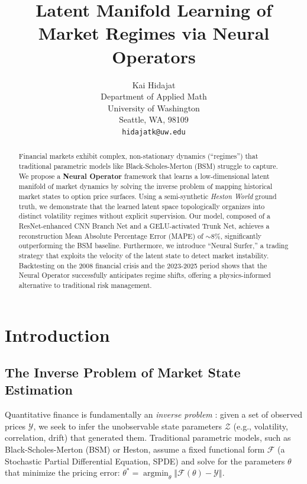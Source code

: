 \documentclass{article}
\title{Latent Manifold Learning of Market Regimes via Neural Operators}
\author{%
  Kai Hidajat \\
  Department of Applied Math \\
  University of Washington \\
  Seattle, WA, 98109\\
  \texttt{hidajatk@uw.edu} \\
}
\newcommand\norm[1]{\left\Vert #1 \right\Vert}
\newcommand{\argmin}{\operatorname{argmin}}
\begin{document}
\maketitle

\begin{abstract}
    Financial markets exhibit complex, non-stationary dynamics (``regimes'') that traditional parametric models like Black-Scholes-Merton (BSM) struggle to capture. We propose a \textbf{Neural Operator} framework that learns a low-dimensional latent manifold of market dynamics by solving the inverse problem of mapping historical market states to option price surfaces. Using a semi-synthetic \emph{Heston World} ground truth, we demonstrate that the learned latent space topologically organizes into distinct volatility regimes without explicit supervision. Our model, composed of a ResNet-enhanced CNN Branch Net and a GELU-activated Trunk Net, achieves a reconstruction Mean Absolute Percentage Error (MAPE) of \(\sim\!8\%\), significantly outperforming the BSM baseline. Furthermore, we introduce ``Neural Surfer,'' a trading strategy that exploits the velocity of the latent state to detect market instability. Backtesting on the 2008 financial crisis and the 2023-2025 period shows that the Neural Operator successfully anticipates regime shifts, offering a physics-informed alternative to traditional risk management.
\end{abstract}

\section{Introduction}

\subsection{The Inverse Problem of Market State Estimation}
Quantitative finance is fundamentally an \emph{inverse problem} \citep{bouchouev1997}: given a set of observed prices \(\mathcal{Y}\), we seek to infer the unobservable state parameters \(\mathcal{Z}\) (e.g., volatility, correlation, drift) that generated them. Traditional parametric models, such as Black-Scholes-Merton (BSM) or Heston, assume a fixed functional form \(\mathcal{F}\) (a Stochastic Partial Differential Equation, SPDE) and solve for the parameters \(\theta\) that minimize the pricing error: \(\theta^* = \argmin_\theta \norm{\mathcal{F}(\theta) - \mathcal{Y}}\).
\end{document}
